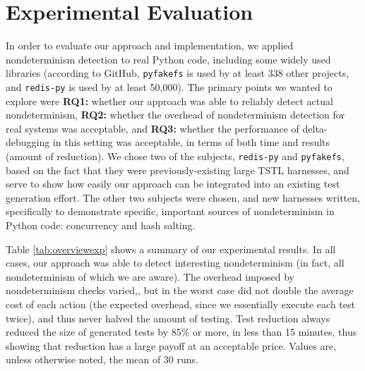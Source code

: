 \section{Experimental Evaluation}

In order to evaluate our approach and implementation, we applied
nondeterminism detection to real Python code, including some widely
used libraries (according to GitHub, {\tt pyfakefs} is used by at least
338 other projects, and {\tt redis-py} is used by at least 50,000).  The primary
points we wanted to explore were {\bf RQ1:} whether our approach was able to reliably detect actual
nondeterminism, {\bf RQ2:} whether the overhead of nondeterminism
detection for real systems was acceptable, and {\bf RQ3:} whether the performance of
delta-debugging in this setting was acceptable, in terms of both time
and results (amount of reduction).  We chose two of
the subjects, {\tt redis-py} and {\tt pyfakefs}, based on the fact that they were previously-existing large
TSTL harnesses, and serve to show how easily our
approach can be integrated into an existing test
generation effort.  The other two subjects were chosen, and new harnesses
written, specifically to demonstrate specific, important sources of
nondeterminism in Python code: concurrency and hash salting.

Table \ref{tab:overviewexp} shows a summary of our experimental
results.  In all cases, our approach was able to detect interesting
nondeterminism (in fact, all nondeterminism of which we are aware).  The overhead imposed by nondeterminism
checks varied,, but in the worst case did not double the
average cost of each action (the expected overhead, since we
essentially execute each test twice), and thus never halved the amount of
testing.  Test reduction always reduced the size of
generated tests by 85\% or more, in less than 15 minutes, thus showing that reduction
has a large payoff at an acceptable price.  Values are, unless otherwise noted, the mean of 30 runs.

